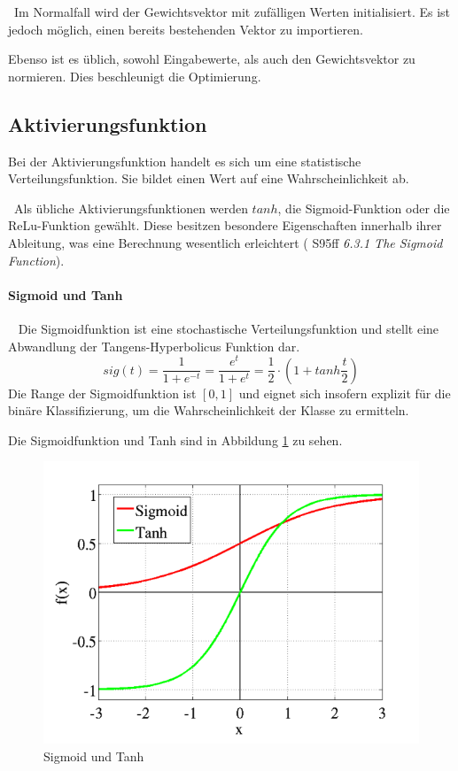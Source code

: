 ~\newline Im Normalfall wird der Gewichtsvektor mit zufälligen Werten initialisiert. Es ist jedoch möglich, einen bereits bestehenden Vektor zu importieren. 

Ebenso ist es üblich, sowohl Eingabewerte, als auch den Gewichtsvektor zu normieren. Dies beschleunigt die Optimierung. 
\subsection{Aktivierungsfunktion}
\label{subsec:Aktivierungsfunktion} 
Bei der Aktivierungsfunktion handelt es sich um eine statistische Verteilungsfunktion. Sie bildet einen Wert auf eine Wahrscheinlichkeit ab. 

~\newline Als übliche Aktivierungsfunktionen werden $tanh$, die Sigmoid-Funktion oder die ReLu-Funktion gewählt. Diese besitzen besondere Eigenschaften innerhalb ihrer Ableitung, was eine Berechnung wesentlich erleichtert (\cite{stroetmann} S95ff \textit{6.3.1 The Sigmoid Function}).

\paragraph{Sigmoid und Tanh}~\newline
Die Sigmoidfunktion ist eine stochastische Verteilungsfunktion und stellt eine Abwandlung der Tangens-Hyperbolicus Funktion dar. 
\begin{equation}
\label{eq:sigmoid}
sig(t) = \dfrac{1}{1+e^{-t}}=\dfrac{e^t}{1+ e^t}= \frac{1}{2} \cdot ( 1 + tanh \frac{t}{2})
\end{equation}
Die Range der Sigmoidfunktion ist $[0,1]$ und eignet sich insofern explizit für die binäre Klassifizierung, um die Wahrscheinlichkeit der Klasse zu ermitteln. 

Die Sigmoidfunktion und Tanh sind in Abbildung \ref{fig:SigTanh} zu sehen. 

\begin{figure}[h]
	\begin{center}
		\includegraphics[width=0.65\linewidth]{Bilder/sigmoidtanhplot}
		\caption[Sigmoid und Tanh: \url{
			https://towardsdatascience.com/activation-functions-neural-networks-1cbd9f8d91d6}]{Sigmoid und Tanh}
		\label{fig:SigTanh}
	\end{center}
\end{figure}  

